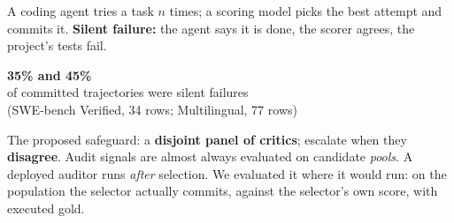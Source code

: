\documentclass{article}
\newcommand{\bignum}[1]{{\fontsize{110}{114}\selectfont\bfseries\color{red}#1}}
\begin{document}
\vspace{18pt}
\begin{minipage}[t]{0.315\textwidth}\vspace{0pt}
\begin{tcolorbox}[poster,title=The question]
A coding agent tries a task $n$ times; a scoring model picks the best attempt and commits it. \textbf{Silent failure:} the agent says it is done, the scorer agrees, the project's tests fail.

\begin{center}\bignum{35\% and 45\%}\\[4pt]{\fontsize{33}{39}\selectfont of committed trajectories were silent failures\\ (SWE-bench Verified, 34 rows; Multilingual, 77 rows)}\end{center}

The proposed safeguard: a \textbf{disjoint panel of critics}; escalate when they \textbf{disagree}. Audit signals are almost always evaluated on candidate \emph{pools}. A deployed auditor runs \emph{after} selection. We evaluated it where it would run: on the population the selector actually commits, against the selector's own score, with executed gold.
\end{tcolorbox}


\end{minipage}
\end{document}
